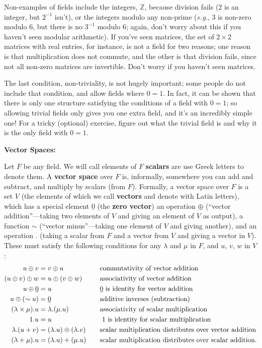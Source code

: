 \documentclass{article}
\let\uline\underline
\begin{document}
Non-examples of fields include the integers, $\mathbb{Z}$, because division fails (2 is an integer, but $2^{-1}$ isn't), or the integers modulo any non-prime (\textit{e.g.}, 3 is non-zero modulo 6, but there is no $3^{-1}$ modulo 6; again, don't worry about this if you haven't seen modular arithmetic). If you've seen matrices, the set of $2\times 2$ matrices with real entries, for instance, is not a field for two reasons; one reason is that multiplication does not commute, and the other is that division fails, since not all non-zero matrices are invertible. Don't worry if you haven't seen matrices.

The last condition, non-triviality, is not hugely important; some people do not include that condition, and allow fields where $0=1$. In fact, it can be shown that there is only one structure satisfying the conditions of a field with $0=1$; so allowing trivial fields only gives you one extra field, and it's an incredibly simple one! For a tricky (optional) exercise, figure out what the trivial field is and why it is the only field with $0=1$.\bigskip


\textbf{Vector Spaces:}\bigskip

Let $F$ be any field. We will call elements of $F$ \textbf{scalars} are use Greek letters to denote them. A \textbf{vector space} over $F$ is, informally, somewhere you can add and subtract, and multiply by scalars (from $F$). Formally, a vector space over $F$ is a set $V$ (the elements of which we call \textbf{vectors} and denote with Latin letters), which has a special element $\uline{0}$ (the \textbf{zero vector}) an operation $\oplus$ (``vector addition''---taking two elements of $V$ and giving an element of $V$ as output), a function $\sim$ (``vector minus''---taking one element of $V$ and giving another), and an operation $.$ (taking a scalar from $F$ and a vector from $V$ and giving a vector in $V$). These must satisfy the following conditions for any $\lambda$ and $\mu$ in $F$, and $u$, $v$, $w$ in $V$:
\begin{alignat*}{2}
	u\oplus v&=v\oplus u&& \mbox{commutativity of vector addition}\\
	(u\oplus v)\oplus w&=u\oplus (v\oplus w)&& \mbox{associativity of vector addition}\\
	u\oplus \uline{0}&=u&& \mbox{\uline{0} is identity for vector addition}\\
	u\oplus(\sim u)&= \uline{0}&&\mbox{additive inverses (subtraction)}\\
	(\lambda\times \mu). u&=\lambda. (\mu. u) &&\mbox{associativity of scalar multiplication}\\
	1.u &= u&&\mbox{ 1 is identity for scalar multiplication}\\
	\lambda. (u+v)&=(\lambda. u)\oplus(\lambda.v) \quad&&\mbox{scalar multiplication distributes over vector addition}\\
	(\lambda+\mu).u&=(\lambda.u)+(\mu.u)\quad &&\mbox{scalar multiplication distributes over scalar addition.}
\end{alignat*}
\end{document}

